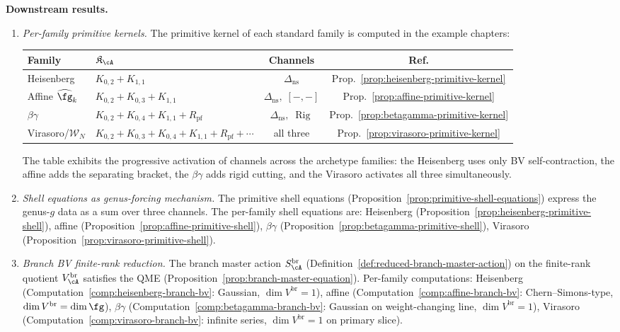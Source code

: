 \smallskip\noindent
\textbf{Downstream results.}
\begin{enumerate}[label=\textup{(\alph*)}]
\item \emph{Per-family primitive kernels.}
  The primitive kernel of each standard family is computed in the
  example chapters:
  \begin{center}
  \renewcommand{\arraystretch}{1.2}
  \begin{tabular}{llcc}
  \textbf{Family} & $\mathfrak K_\cA$ &
  \textbf{Channels} & \textbf{Ref.} \\
  \hline
  Heisenberg & $K_{0,2} + K_{1,1}$ &
  $\Delta_{\mathrm{ns}}$ &
  Prop.~\ref{prop:heisenberg-primitive-kernel} \\
  Affine $\widehat\fg_k$ & $K_{0,2} + K_{0,3} + K_{1,1}$ &
  $\Delta_{\mathrm{ns}},\; [-,-]$ &
  Prop.~\ref{prop:affine-primitive-kernel} \\
  $\beta\gamma$ & $K_{0,2} + K_{0,4} + K_{1,1} + R_{\mathrm{pf}}$ &
  $\Delta_{\mathrm{ns}},\; \operatorname{Rig}$ &
  Prop.~\ref{prop:betagamma-primitive-kernel} \\
  Virasoro/$\mathcal{W}_N$ & $K_{0,2} + K_{0,3} + K_{0,4} + K_{1,1} + R_{\mathrm{pf}} + \cdots$ &
  all three &
  Prop.~\ref{prop:virasoro-primitive-kernel}
  \end{tabular}
  \end{center}
  The table exhibits the progressive activation of channels across
  the archetype families: the Heisenberg uses only BV
  self-contraction, the affine adds the separating bracket, the
  $\beta\gamma$ adds rigid cutting, and the Virasoro activates all
  three simultaneously.

\item \emph{Shell equations as genus-forcing mechanism.}
  The primitive shell equations
  (Proposition~\ref{prop:primitive-shell-equations}) express
  the genus-$g$ data as a sum over three channels.
  The per-family shell equations are:
  Heisenberg (Proposition~\ref{prop:heisenberg-primitive-shell}),
  affine (Proposition~\ref{prop:affine-primitive-shell}),
  $\beta\gamma$ (Proposition~\ref{prop:betagamma-primitive-shell}),
  Virasoro (Proposition~\ref{prop:virasoro-primitive-shell}).

\item \emph{Branch BV finite-rank reduction.}
  The branch master action $S_\cA^{\mathrm{br}}$
  (Definition~\ref{def:reduced-branch-master-action}) on the
  finite-rank quotient $V_\cA^{\mathrm{br}}$ satisfies the QME
  (Proposition~\ref{prop:branch-master-equation}).
  Per-family computations:
  Heisenberg (Computation~\ref{comp:heisenberg-branch-bv}:
  Gaussian, $\dim V^{\mathrm{br}} = 1$),
  affine (Computation~\ref{comp:affine-branch-bv}:
  Chern--Simons-type, $\dim V^{\mathrm{br}} = \dim\fg$),
  $\beta\gamma$ (Computation~\ref{comp:betagamma-branch-bv}:
  Gaussian on weight-changing line, $\dim V^{\mathrm{br}} = 1$),
  Virasoro (Computation~\ref{comp:virasoro-branch-bv}: infinite
  series, $\dim V^{\mathrm{br}} = 1$ on primary slice).


\end{enumerate}

